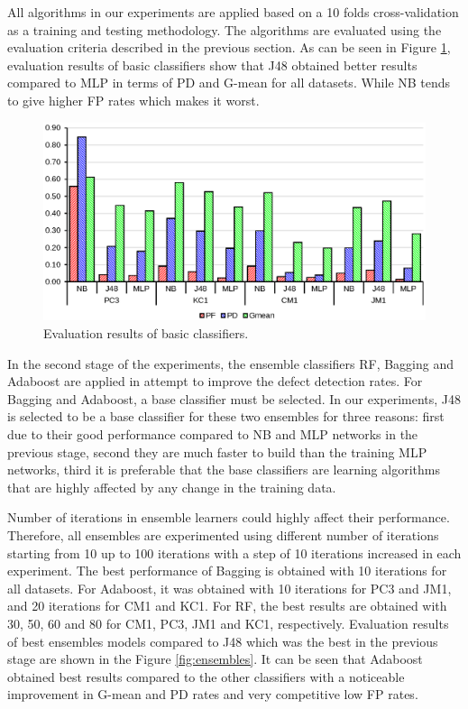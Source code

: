 \documentclass[runningheads,a4paper]{llncs}
\begin{document}
All algorithms in our experiments are applied based on a 10 folds cross-validation as a training and testing methodology. The algorithms are evaluated using the evaluation criteria described in the previous section. As can be seen in Figure  \ref{fig:basic}, evaluation results of basic classifiers show that J48 obtained better results compared to MLP in terms of PD and G-mean for all datasets. While NB tends to give higher FP rates which makes it worst. 



\begin{figure}[H]
\centering
\includegraphics[scale=0.6]{basicresults.eps}
\caption{Evaluation results of basic classifiers.}
\label{fig:basic}
\end{figure}


In the second stage of the experiments, the ensemble classifiers RF, Bagging and Adaboost are applied in attempt to improve the defect detection rates. For Bagging and Adaboost, a base classifier must be selected. In our experiments, J48 is selected to be a base classifier for these two ensembles for three reasons: first due to their good performance compared to NB and MLP networks in the previous stage, second they are much faster to build than the training MLP networks, third it is preferable that the base classifiers are learning algorithms that are highly affected by any change in the training data. 

Number of iterations in ensemble learners could highly affect their performance. Therefore, all ensembles are experimented using different number of iterations starting from 10 up to 100 iterations with a step of 10 iterations increased in each experiment. The best performance of Bagging is obtained with 10 iterations for all datasets. For Adaboost, it was obtained with 10 iterations for PC3 and JM1, and 20 iterations for CM1 and KC1. For RF, the best results are obtained with 30, 50, 60 and 80 for CM1, PC3, JM1 and KC1, respectively. Evaluation results of best ensembles models compared to J48 which was the best in the previous stage are shown in the Figure \ref{fig:ensembles}. It can be seen that Adaboost obtained best results compared to the other classifiers with a noticeable improvement in G-mean and PD rates and very competitive low FP rates.
\end{document}
